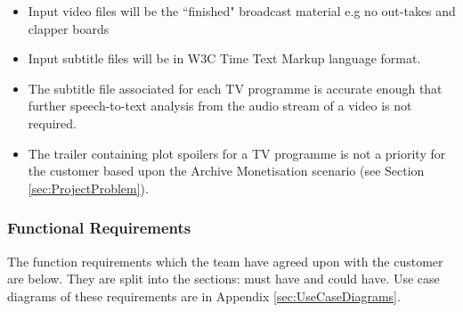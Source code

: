 \begin{itemize}
\item{Input video files will be the ``finished" broadcast material e.g no out-takes and clapper boards}
\item{Input subtitle files will be in W3C Time Text Markup language format.}
\item{The subtitle file associated for each TV programme is accurate enough that further speech-to-text analysis from the audio stream of a video is not required.}
\item{The trailer containing plot spoilers for a TV programme is not a priority for the customer based upon the Archive Monetisation scenario (see Section \ref{sec:ProjectProblem}).}
\end{itemize}
\newpage
	\subsubsection{Functional Requirements}
The function requirements which the team have agreed upon with the customer are below. They are split into the sections: must have and could have. Use case diagrams of these requirements are in Appendix \ref{sec:UseCaseDiagrams}.

